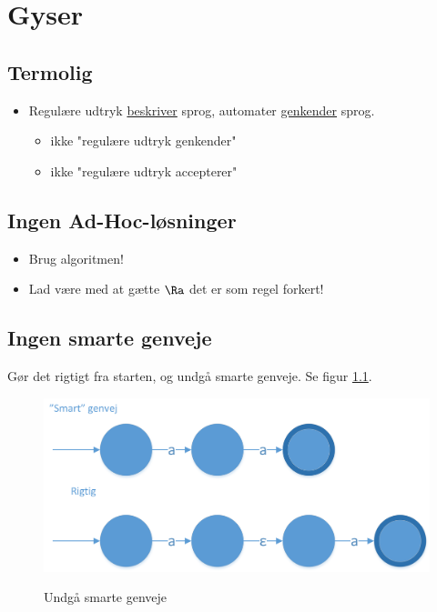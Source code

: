 \documentclass[a4paper,10pt,article]{memoir}
\begin{document}
\chapter{Gyser}
\section{Termolig}
\begin{itemize}
\item Regulære udtryk \underline{beskriver} sprog, automater \underline{genkender} sprog.
\begin{itemize}
\item ikke "regulære udtryk genkender"
\item ikke "regulære udtryk accepterer"
\end{itemize}
\end{itemize}
\section{Ingen Ad-Hoc-løsninger}
\begin{itemize}
\item Brug algoritmen!
\item Lad være med at gætte $\Ra$ det er som regel forkert!
\end{itemize}
\section{Ingen smarte genveje}
Gør det rigtigt fra starten, og undgå smarte genveje. Se figur \ref{fig:fig23}.
\begin{figure}[h]%
\centering
\includegraphics[width=\textwidth]{Fig23x.png}
\label{fig:fig23}
\caption{Undgå smarte genveje}
\end{figure}
\end{document}
